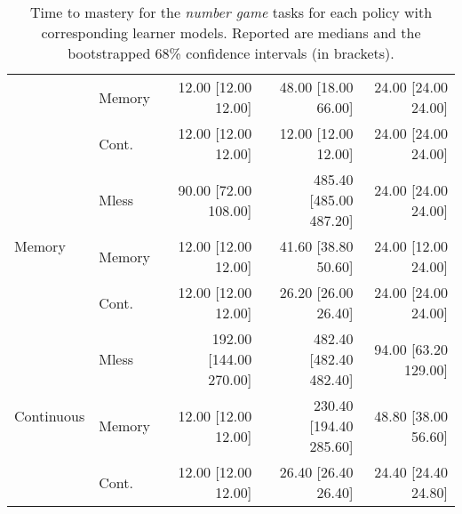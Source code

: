\begin{table}[hb!]
\begin{tabular}{ll|r|r|r}
                                                                & Memory        & 	 12.00 [12.00 12.00]    & 48.00 [18.00 66.00]    & 24.00 [24.00 24.00]   \\
                                                                & Cont.    & 	 12.00 [12.00 12.00]    & 12.00 [12.00 12.00]    & 24.00 [24.00 24.00]   \\
\hline
\multirow{3}{*}{Memory}                                         & Mless    & 	 90.00 [72.00 108.00]   & 485.40 [485.00 487.20] & 24.00 [24.00 24.00]   \\
                                                                & Memory        & 	 12.00 [12.00 12.00]    & 41.60 [38.80 50.60]    & 24.00 [12.00 24.00]   \\
                                                                & Cont.    & 	 12.00 [12.00 12.00]    & 26.20 [26.00 26.40]    & 24.00 [24.00 24.00]   \\
\hline
\multirow{3}{*}{Continuous}                                     & Mless    & 	 192.00 [144.00 270.00] & 482.40 [482.40 482.40] & 94.00 [63.20 129.00]  \\
                                                                & Memory        & 	 12.00 [12.00 12.00]    & 230.40 [194.40 285.60] & 48.80 [38.00 56.60]   \\
                                                                & Cont.    & 	 12.00 [12.00 12.00]    & 26.40 [26.40 26.40]    & 24.40 [24.40 24.80]   \\

\hline
\end{tabular}
\caption{Time to mastery for the \textit{number game} tasks for each policy with corresponding learner models. Reported are medians and the bootstrapped 68\% confidence intervals (in brackets).
}
\label{tab:results-t2}
\end{table}



